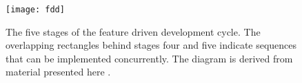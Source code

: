 \begin{figure}[h]
\centering
\texttt{[image: fdd]}
\caption{
    The five stages of the feature driven development cycle. 
    The overlapping rectangles behind stages four and five indicate sequences
    that can be implemented concurrently. 
    The diagram is derived from material presented here \cite[p.~90]{fddjavacol}.
}
\label{fig:rasterdemo}
\end{figure}
